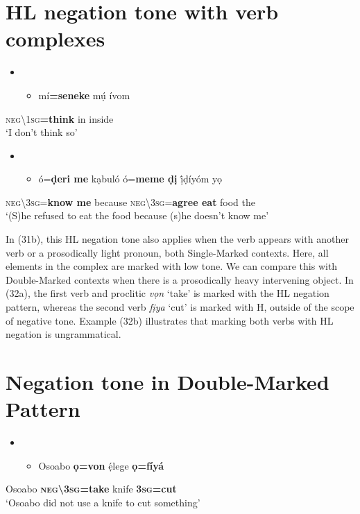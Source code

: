 \documentclass[output=paper]{langsci/langscibook}
\begin{document}
\chapter[HL negation tone with verb complexes ]{HL negation tone with verb complexes\textit{ }}
\begin{itemize}
\item \setcounter{itemize}{0}
\begin{itemize}
\item \gll mí\textbf{=seneke}      mụ́   ívom\\
\end{itemize}
\end{itemize}
     \textsc{neg{\textbackslash}1sg}\textbf{=think}    in   inside\\
\glt ‘I don’t think so’ \citep[32]{Kari2004}
\z

\begin{itemize}
\item \setcounter{itemize}{0}
\begin{itemize}
\item \gll ó=\textbf{ḍeri       me}   kạbuló   ó=\textbf{meme     ḍị}   ị́ḍíyóm   yọ\\
\end{itemize}
\end{itemize}
     \textsc{neg{\textbackslash}3sg}=\textbf{know  me}    because   \textsc{neg{\textbackslash}3sg}=\textbf{agree   eat}   food   the\\
\glt ‘(S)he refused to eat the food because (s)he doesn’t know me’ \citep[45]{Kari2004}  
\z

In (31b), this HL negation tone also applies when the verb appears with another verb or a prosodically light pronoun, both Single-Marked contexts. Here, all elements in the complex are marked with low tone. We can compare this with Double-Marked contexts when there is a prosodically heavy intervening object. In (32a), the first verb and proclitic \textit{vọn} ‘take’ is marked with the HL negation pattern, whereas the second verb \textit{fịya} ‘cut’ is marked with H, outside of the scope of negative tone. Example (32b) illustrates that marking both verbs with HL negation is ungrammatical. 

\chapter[Negation tone in Double{}-Marked Pattern]{Negation tone in Double-Marked Pattern}
\begin{itemize}
\item \setcounter{itemize}{0}
\begin{itemize}
\item \gll Osoabo   \textbf{ọ=von}       ẹ́lege   \textbf{ọ=fíyá}\\
\end{itemize}
\end{itemize}
     Osoabo   \textbf{\textsc{neg{\textbackslash}3sg}}\textbf{=take}   knife   \textbf{3}\textbf{\textsc{sg}}\textbf{=cut}\\
\glt ‘Osoabo did not use a knife to cut something’ \citep[111]{Kari2004}
\z
\end{document}
